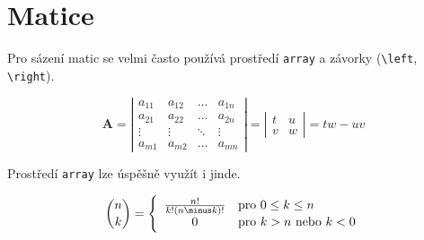\documentclass[twocolumn, 11pt, a4paper]{article}
\begin{document}
\section{Matice}
Pro sázení matic se velmi často používá prostředí \texttt{array} a závorky (\verb|\left|, \verb|\right|). 

$$
	\textbf{A} =
	\left|
		\begin{array}{cccc}
			a_{11} & a_{12} & \dots & a_{1n} \\
			a_{21} & a_{22} & \dots & a_{2n} \\
			\vdots & \vdots & \ddots &\vdots \\
			a_{m1} & a_{m2} & \dots & a_{mn}
		\end{array}
	\right|
	=
	\left|
		\begin{array}{cc}
			t & u \\
			v & w
		\end{array}
	\right|
	=
	tw \minus uv
$$

Prostředí \texttt{array} lze úspěšně využít i jinde.

$$
	\binom{n}{k}
	=
	\Bigg\{
		\begin{array}{c l}
			\frac{n!}{k!( n\minus k)!}	& \text{pro } 0 \leq k \leq n \\
			0							& \text{pro } k > n \text{ nebo } k < 0 
		\end{array}
$$
\end{document}
